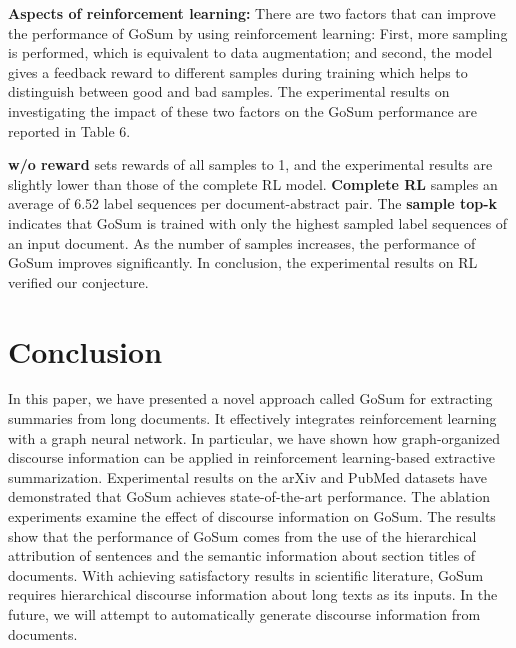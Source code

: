 \documentclass[11pt,a4paper]{article}
\begin{document}
\noindent \textbf{Aspects of reinforcement learning:}
There are two factors that can improve the performance of GoSum by using reinforcement learning: First, more sampling is performed, which is equivalent to data augmentation; and second, the model gives a feedback reward to different samples during training which helps to distinguish between good and bad samples. The experimental results on investigating the impact of these two factors on the GoSum performance are reported in Table 6. 

\textbf{w/o reward} sets rewards of all samples to 1, and the experimental results are slightly lower than those of the complete RL model.
\textbf{Complete RL} samples an average of 6.52 label sequences per document-abstract pair.
The \textbf{sample top-k} indicates that GoSum is trained with only the  highest sampled label sequences of an input document.
As the number of samples increases, the  performance of GoSum improves significantly. In conclusion, the experimental results on RL verified our conjecture.



 

\section{Conclusion}
\label{sec:conclude}

In this paper, we have presented a novel approach called GoSum for extracting summaries from long documents. It effectively integrates reinforcement learning with a graph neural network. In particular, we have shown how graph-organized discourse information can  be applied in reinforcement learning-based extractive summarization.
Experimental results on the arXiv and PubMed datasets have demonstrated that GoSum achieves state-of-the-art performance. The ablation experiments examine the effect of discourse information on GoSum. The results show that the performance of GoSum comes from the use of the hierarchical attribution of sentences and the semantic information about section titles of documents.
With achieving satisfactory results in scientific literature, GoSum requires  hierarchical discourse information about long texts as its inputs. In the future, we will attempt to automatically generate discourse information from documents.
\end{document}
